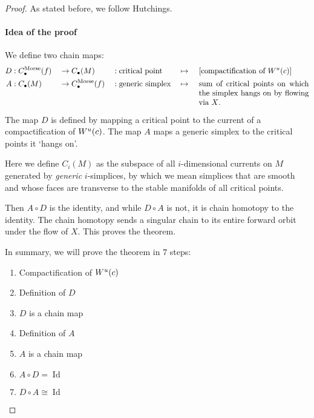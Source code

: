 \begin{proof}
    As stated before, we follow Hutchings.
    \paragraph{Idea of the proof}
    
    We define two chain maps:
    \begin{alignat*}{5}
        D&: C_\bul^{\text{Morse}}(f) &&\to  C_\bul(M)&&: \text{critical point} &&\mapsto &&\ [\text{compactification of $\unstable{c}$}]\\
        A&: C_\bul(M) &&\to  C_\bul^{\text{Morse}}(f)&&: \text{generic simplex} &&\mapsto &&\ \parbox[t][][t]{5cm}{sum of critical points on which the simplex hangs on by flowing via $X$.}
    \end{alignat*}
\begin{marginfigure}
    \centering
    \caption{The map $D$ is defined by mapping a critical point to the current of a compactification of $W^u(c)$. The map $A$ maps a generic simplex to the critical points it `hangs on'.}
    \label{fig:idea-of-the-proof-maps-a-and-d}
\end{marginfigure}

    Here we define $C_i(M)$ as the subspace of all  $i$-dimensional currents on $M$ generated by \emph{generic} $i$-simplices, by which we mean simplices that are smooth and whose faces are transverse to the stable manifolds of all critical points.


    Then $A  \circ D$ is the identity, and while $D  \circ  A$ is not, it is chain homotopy to the identity.
    The chain homotopy sends a singular chain to its entire forward orbit under the flow of $X$.
    This proves the theorem.

    In summary, we will prove the theorem in $7$ steps:
    \begin{enumerate}
        \item Compactification of $W^u(c)$
        \item Definition of $D$
        \item $D$ is a chain map
        \item Definition of $A$
        \item $A$ is a chain map
        \item $A  \circ D = \operatorname{Id}$
        \item  $D  \circ A \cong \operatorname{Id}$
    \end{enumerate}


\end{proof}
